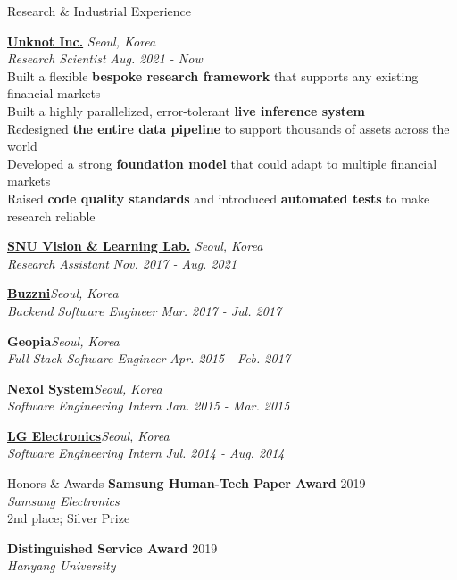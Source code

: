 \documentclass{resume} %
\begin{document}
\begin{rSection}{Research \& Industrial Experience}

{\bf {\href{https://www.linkedin.com/company/unknot-inc/}{Unknot Inc.}}} \hfill{\em Seoul, Korea}\\
\textit{Research Scientist} \hfill{\em Aug. 2021 - Now}\\
{\small Built a flexible {\bf bespoke research framework} that supports any existing financial markets}\\
{\small Built a highly parallelized, error-tolerant {\bf live inference system}}\\
{\small Redesigned {\bf the entire data pipeline} to support thousands of assets across the world}\\
{\small Developed a strong {\bf foundation model} that could adapt to multiple financial markets}\\
{\small Raised {\bf code quality standards} and introduced {\bf automated tests} to make research reliable}

{\bf \href{https://vision.snu.ac.kr/}{SNU Vision \& Learning Lab.}} \hfill{\em Seoul, Korea} \\
\textit{Research Assistant} \hfill{\em Nov. 2017 - Aug. 2021}

{\bf \href{https://www.buzzni.com/}{Buzzni}}\hfill{\em Seoul, Korea} \\
\textit{Backend Software Engineer} \hfill{\em Mar. 2017 - Jul. 2017}

{\bf Geopia}\hfill{\em Seoul, Korea}\\
\textit{Full-Stack Software Engineer} \hfill{\em Apr. 2015 - Feb. 2017}

{\bf Nexol System}\hfill{\em Seoul, Korea}\\
\textit{Software Engineering Intern} \hfill{\em Jan. 2015 - Mar. 2015}

{\bf \href{https://www.lg.com/us}{LG Electronics}}\hfill{\em Seoul, Korea}\\
\textit{Software Engineering Intern} \hfill{\em Jul. 2014 - Aug. 2014}

\end{rSection}


\newpage 

\begin{rSection}{Honors \& Awards}
	{\bf Samsung Human-Tech Paper Award} \hfill{2019}\\
	\textit{Samsung Electronics}\\
	2nd place; Silver Prize
	
	{\bf Distinguished Service Award} \hfill{2019}\\
	\textit{Hanyang University}
\end{rSection}
\end{document}
